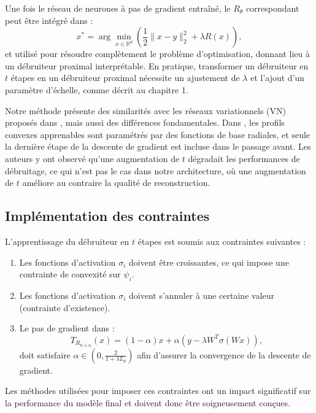 \documentclass[a4paper, 12pt]{report} %
\begin{document}
Une fois le réseau de neurones à pas de gradient entraîné, le \( R_\theta \) correspondant peut être intégré dans :  
\[
x^* = \arg \min_{x \in \mathbb{R}^d} \left( \frac{1}{2} \| x - y \|_2^2 + \lambda R(x) \right),
\]
et utilisé pour résoudre complètement le problème d’optimisation, donnant lieu à un débruiteur proximal interprétable. En pratique, transformer un débruiteur en \( t \) étapes en un débruiteur proximal nécessite un ajustement de \( \lambda \) et l’ajout d’un paramètre d’échelle, comme décrit au chapitre 1.

Notre méthode présente des similarités avec les réseaux variationnels (VN) proposés dans \cite{kobler2017variational}, mais aussi des différences fondamentales. Dans \cite{kobler2017variational}, les profils convexes apprenables sont paramétrés par des fonctions de base radiales, et seule la dernière étape de la descente de gradient est incluse dans le passage avant. Les auteurs y ont observé qu’une augmentation de \( t \) dégradait les performances de débruitage, ce qui n’est pas le cas dans notre architecture, où une augmentation de \( t \) améliore au contraire la qualité de reconstruction.

\subsection{Implémentation des contraintes}

L'apprentissage du débruiteur en \( t \) étapes est soumis aux contraintes suivantes :

\begin{enumerate}
    \item Les fonctions d'activation \( \sigma_i \) doivent être croissantes, ce qui impose une contrainte de convexité sur \( \psi_i \).
    \item Les fonctions d'activation \( \sigma_i \) doivent s'annuler à une certaine valeur (contrainte d'existence).
    \item Le pas de gradient dans :
    \[
    T_{R_{\theta, \lambda, \alpha}}(x) = (1 - \alpha)x + \alpha \left( y - \lambda W^T \sigma(Wx) \right),
    \]
    doit satisfaire \( \alpha \in \left(0, \frac{2}{1 + \lambda L_\theta}\right) \) afin d’assurer la convergence de la descente de gradient.
\end{enumerate}

Les méthodes utilisées pour imposer ces contraintes ont un impact significatif sur la performance du modèle final et doivent donc être soigneusement conçues.
\end{document}

